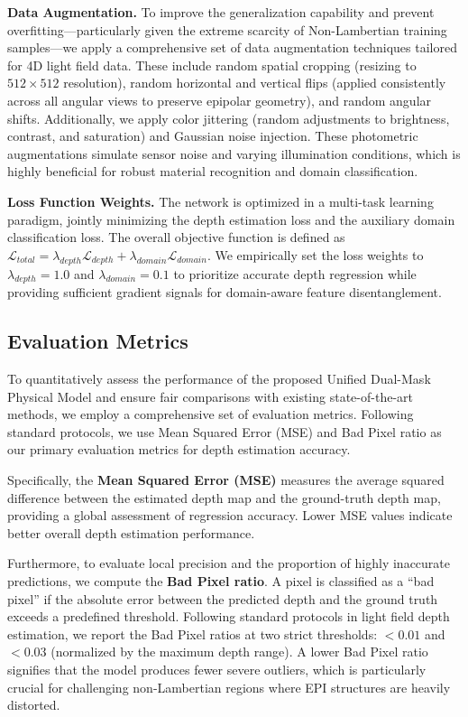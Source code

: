 \documentclass[lettersize,journal]{IEEEtran}
\begin{document}
\textbf{Data Augmentation.} 
To improve the generalization capability and prevent overfitting---particularly given the extreme scarcity of Non-Lambertian training samples---we apply a comprehensive set of data augmentation techniques tailored for 4D light field data. These include random spatial cropping (resizing to $512 \times 512$ resolution), random horizontal and vertical flips (applied consistently across all angular views to preserve epipolar geometry), and random angular shifts. Additionally, we apply color jittering (random adjustments to brightness, contrast, and saturation) and Gaussian noise injection. These photometric augmentations simulate sensor noise and varying illumination conditions, which is highly beneficial for robust material recognition and domain classification.

\textbf{Loss Function Weights.} 
The network is optimized in a multi-task learning paradigm, jointly minimizing the depth estimation loss and the auxiliary domain classification loss. The overall objective function is defined as $\mathcal{L}_{total} = \lambda_{depth} \mathcal{L}_{depth} + \lambda_{domain} \mathcal{L}_{domain}$. We empirically set the loss weights to $\lambda_{depth} = 1.0$ and $\lambda_{domain} = 0.1$ to prioritize accurate depth regression while providing sufficient gradient signals for domain-aware feature disentanglement.

\subsection{Evaluation Metrics}

To quantitatively assess the performance of the proposed Unified Dual-Mask Physical Model and ensure fair comparisons with existing state-of-the-art methods, we employ a comprehensive set of evaluation metrics. Following standard protocols, we use Mean Squared Error (MSE) and Bad Pixel ratio as our primary evaluation metrics for depth estimation accuracy.

Specifically, the \textbf{Mean Squared Error (MSE)} measures the average squared difference between the estimated depth map and the ground-truth depth map, providing a global assessment of regression accuracy. Lower MSE values indicate better overall depth estimation performance.

Furthermore, to evaluate local precision and the proportion of highly inaccurate predictions, we compute the \textbf{Bad Pixel ratio}. A pixel is classified as a ``bad pixel'' if the absolute error between the predicted depth and the ground truth exceeds a predefined threshold. Following standard protocols in light field depth estimation, we report the Bad Pixel ratios at two strict thresholds: $<0.01$ and $<0.03$ (normalized by the maximum depth range). A lower Bad Pixel ratio signifies that the model produces fewer severe outliers, which is particularly crucial for challenging non-Lambertian regions where EPI structures are heavily distorted.
\end{document}

